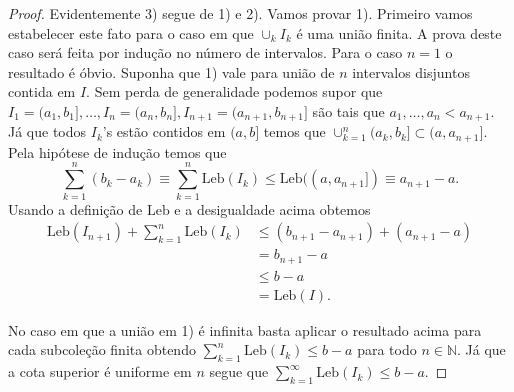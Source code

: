 \begin{proof}
Evidentemente 3) segue de 1) e 2).
Vamos provar 1). Primeiro vamos 
estabelecer este fato para o caso 
em que $\cup_{k} I_k$ é uma união finita. 
A prova deste caso será feita por indução 
no número de intervalos.
Para o caso $n=1$ o resultado é óbvio. 
Suponha que 1) vale para união de $n$ intervalos
disjuntos contida em $I$. Sem perda de generalidade 
podemos supor que 
$I_1=(a_1,b_1],\ldots, I_n=(a_n,b_n], I_{n+1}=(a_{n+1},b_{n+1}]$
são tais que $a_1,\ldots, a_n <a_{n+1}$. 
Já que todos $I_k$'s estão contidos em $(a,b]$
temos que 
$\cup_{k=1}^n (a_k,b_k]\subset (a,a_{n+1}]$.
Pela hipótese de indução temos que
\[
\sum_{k=1}^n (b_k-a_k)
\equiv
\sum_{k=1}^n \mathrm{Leb}(I_k)
\leq
\mathrm{Leb}((a,a_{n+1}])
\equiv
a_{n+1}-a.
\] 
Usando a definição de $\mathrm{Leb}$ e a desigualdade 
acima obtemos
\begin{align*}
\mathrm{Leb}(I_{n+1})
+ 
{\textstyle \sum_{k=1}^n \mathrm{Leb}(I_k)}
&\leq
(b_{n+1}-a_{n+1})+(a_{n+1}-a)
\\
&=
b_{n+1}-a
\\
&\leq
b-a
\\
&=
\mathrm{Leb}(I).
\end{align*}

No caso em que a união em 1) é infinita basta aplicar o 
resultado acima para cada subcoleção finita obtendo 
$\sum_{k=1}^n \mathrm{Leb}(I_k)\leq b-a$ para todo $n\in\mathbb{N}$.
Já que a cota superior é uniforme em $n$ segue que 
$\sum_{k=1}^{\infty} \mathrm{Leb}(I_k)\leq b-a$.




\end{proof}
